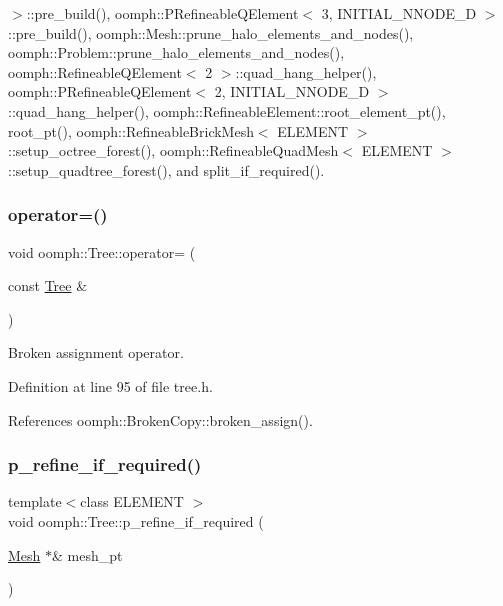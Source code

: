 $>$\+::pre\+\_\+build(), oomph\+::\+P\+Refineable\+Q\+Element$<$ 3, I\+N\+I\+T\+I\+A\+L\+\_\+\+N\+N\+O\+D\+E\+\_\+D $>$\+::pre\+\_\+build(), oomph\+::\+Mesh\+::prune\+\_\+halo\+\_\+elements\+\_\+and\+\_\+nodes(), oomph\+::\+Problem\+::prune\+\_\+halo\+\_\+elements\+\_\+and\+\_\+nodes(), oomph\+::\+Refineable\+Q\+Element$<$ 2 $>$\+::quad\+\_\+hang\+\_\+helper(), oomph\+::\+P\+Refineable\+Q\+Element$<$ 2, I\+N\+I\+T\+I\+A\+L\+\_\+\+N\+N\+O\+D\+E\+\_\+D $>$\+::quad\+\_\+hang\+\_\+helper(), oomph\+::\+Refineable\+Element\+::root\+\_\+element\+\_\+pt(), root\+\_\+pt(), oomph\+::\+Refineable\+Brick\+Mesh$<$ E\+L\+E\+M\+E\+N\+T $>$\+::setup\+\_\+octree\+\_\+forest(), oomph\+::\+Refineable\+Quad\+Mesh$<$ E\+L\+E\+M\+E\+N\+T $>$\+::setup\+\_\+quadtree\+\_\+forest(), and split\+\_\+if\+\_\+required().

\mbox{\label{classoomph_1_1Tree_a931f95671b788bbba03a7908bb205e5e}} 
\subsubsection{\texorpdfstring{operator=()}{operator=()}}
{\footnotesize\ttfamily void oomph\+::\+Tree\+::operator= (\begin{DoxyParamCaption}\item[{const \hyperlink{classoomph_1_1Tree}{Tree} \&}]{ }\end{DoxyParamCaption})\hspace{0.3cm}{\ttfamily [inline]}}



Broken assignment operator. 



Definition at line 95 of file tree.\+h.



References oomph\+::\+Broken\+Copy\+::broken\+\_\+assign().

\mbox{\label{classoomph_1_1Tree_a6502324233a86eeeadba7f46505656af}} 
\subsubsection{\texorpdfstring{p\+\_\+refine\+\_\+if\+\_\+required()}{p\_refine\_if\_required()}}
{\footnotesize\ttfamily template$<$class E\+L\+E\+M\+E\+NT $>$ \\
void oomph\+::\+Tree\+::p\+\_\+refine\+\_\+if\+\_\+required (\begin{DoxyParamCaption}\item[{\hyperlink{classoomph_1_1Mesh}{Mesh} $\ast$\&}]{mesh\+\_\+pt }\end{DoxyParamCaption})}



